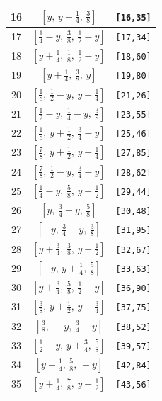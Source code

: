 \documentclass[fleqn,8pt]{jsarticle}
\begin{document}
\begin{longtable}{ccc}
16 & $\left[ y,\, y + \frac{1}{4},\, \frac{3}{8} \right]$ & {\tt [16,35]} \\ \hline
17 & $\left[ \frac{1}{4} - y,\, \frac{3}{8},\, \frac{1}{2} - y \right]$ & {\tt [17,34]} \\ \hline
18 & $\left[ y + \frac{1}{4},\, \frac{1}{8},\, \frac{1}{2} - y \right]$ & {\tt [18,60]} \\ \hline
19 & $\left[ y + \frac{1}{4},\, \frac{3}{8},\, y \right]$ & {\tt [19,80]} \\ \hline
20 & $\left[ \frac{1}{8},\, \frac{1}{2} - y,\, y + \frac{1}{4} \right]$ & {\tt [21,26]} \\ \hline
21 & $\left[ \frac{1}{2} - y,\, \frac{1}{4} - y,\, \frac{3}{8} \right]$ & {\tt [23,55]} \\ \hline
22 & $\left[ \frac{1}{8},\, y + \frac{1}{2},\, \frac{3}{4} - y \right]$ & {\tt [25,46]} \\ \hline
23 & $\left[ \frac{7}{8},\, y + \frac{1}{2},\, y + \frac{1}{4} \right]$ & {\tt [27,85]} \\ \hline
24 & $\left[ \frac{7}{8},\, \frac{1}{2} - y,\, \frac{3}{4} - y \right]$ & {\tt [28,62]} \\ \hline
25 & $\left[ \frac{1}{4} - y,\, \frac{5}{8},\, y + \frac{1}{2} \right]$ & {\tt [29,44]} \\ \hline
26 & $\left[ y,\, \frac{3}{4} - y,\, \frac{5}{8} \right]$ & {\tt [30,48]} \\ \hline
27 & $\left[ - y,\, \frac{3}{4} - y,\, \frac{3}{8} \right]$ & {\tt [31,95]} \\ \hline
28 & $\left[ y + \frac{3}{4},\, \frac{3}{8},\, y + \frac{1}{2} \right]$ & {\tt [32,67]} \\ \hline
29 & $\left[ - y,\, y + \frac{1}{4},\, \frac{5}{8} \right]$ & {\tt [33,63]} \\ \hline
30 & $\left[ y + \frac{3}{4},\, \frac{5}{8},\, \frac{1}{2} - y \right]$ & {\tt [36,90]} \\ \hline
31 & $\left[ \frac{3}{8},\, y + \frac{1}{2},\, y + \frac{3}{4} \right]$ & {\tt [37,75]} \\ \hline
32 & $\left[ \frac{3}{8},\, - y,\, \frac{3}{4} - y \right]$ & {\tt [38,52]} \\ \hline
33 & $\left[ \frac{1}{2} - y,\, y + \frac{3}{4},\, \frac{5}{8} \right]$ & {\tt [39,57]} \\ \hline
34 & $\left[ y + \frac{1}{4},\, \frac{5}{8},\, - y \right]$ & {\tt [42,84]} \\ \hline
35 & $\left[ y + \frac{1}{4},\, \frac{7}{8},\, y + \frac{1}{2} \right]$ & {\tt [43,56]} \\ \hline

\end{longtable}
\end{document}

